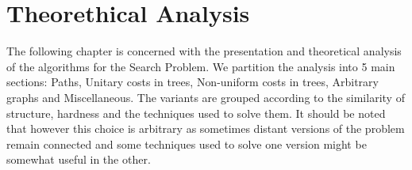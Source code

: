 \chapter{Theorethical Analysis}

The following chapter is concerned with the presentation and theoretical analysis of the algorithms for the Search Problem. We partition the analysis into 5 main sections: Paths, Unitary costs in trees, Non-uniform costs in trees, Arbitrary graphs and Miscellaneous. The variants are grouped according to the similarity of structure, hardness and the techniques used to solve them. It should be noted that however this choice is arbitrary as sometimes distant versions of the problem remain connected and some techniques used to solve one version might be somewhat useful in the other.
%



% 
